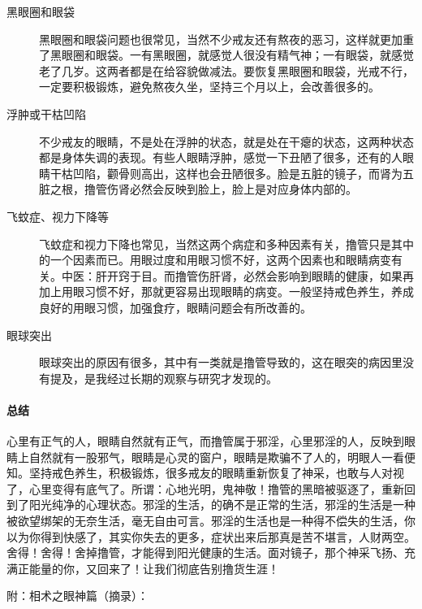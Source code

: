 \begin{description}
    \item[黑眼圈和眼袋] 黑眼圈和眼袋问题也很常见，当然不少戒友还有熬夜的恶习，这样就更加重了黑眼圈和眼袋。一有黑眼圈，就感觉人很没有精气神；一有眼袋，就感觉老了几岁。这两者都是在给容貌做减法。要恢复黑眼圈和眼袋，光戒不行，一定要积极锻炼，避免熬夜久坐，坚持三个月以上，会改善很多的。
    \item[浮肿或干枯凹陷] 不少戒友的眼睛，不是处在浮肿的状态，就是处在干瘪的状态，这两种状态都是身体失调的表现。有些人眼睛浮肿，感觉一下丑陋了很多，还有的人眼睛干枯凹陷，颧骨则高出，这样也会丑陋很多。脸是五脏的镜子，而肾为五脏之根，撸管伤肾必然会反映到脸上，脸上是对应身体内部的。
    \item[飞蚊症、视力下降等] 飞蚊症和视力下降也常见，当然这两个病症和多种因素有关，撸管只是其中的一个因素而已。用眼过度和用眼习惯不好，这两个因素也和眼睛病变有关。中医：肝开窍于目。而撸管伤肝肾，必然会影响到眼睛的健康，如果再加上用眼习惯不好，那就更容易出现眼睛的病变。一般坚持戒色养生，养成良好的用眼习惯，加强食疗，眼睛问题会有所改善的。
    \item[眼球突出] 眼球突出的原因有很多，其中有一类就是撸管导致的，这在眼突的病因里没有提及，是我经过长期的观察与研究才发现的。
\end{description}

\paragraph*{总结}

心里有正气的人，眼睛自然就有正气，而撸管属于邪淫，心里邪淫的人，反映到眼睛上自然就有一股邪气，眼睛是心灵的窗户，眼睛是欺骗不了人的，明眼人一看便知。坚持戒色养生，积极锻炼，很多戒友的眼睛重新恢复了神采，也敢与人对视了，心里变得有底气了。所谓：心地光明，鬼神敬！撸管的黑暗被驱逐了，重新回到了阳光纯净的心理状态。邪淫的生活，的确不是正常的生活，邪淫的生活是一种被欲望绑架的无奈生活，毫无自由可言。邪淫的生活也是一种得不偿失的生活，你以为你得到快感了，其实你失去的更多，症状出来后那真是苦不堪言，人财两空。舍得！舍得！舍掉撸管，才能得到阳光健康的生活。面对镜子，那个神采飞扬、充满正能量的你，又回来了！让我们彻底告别撸货生涯！

附：相术之眼神篇（摘录）：

